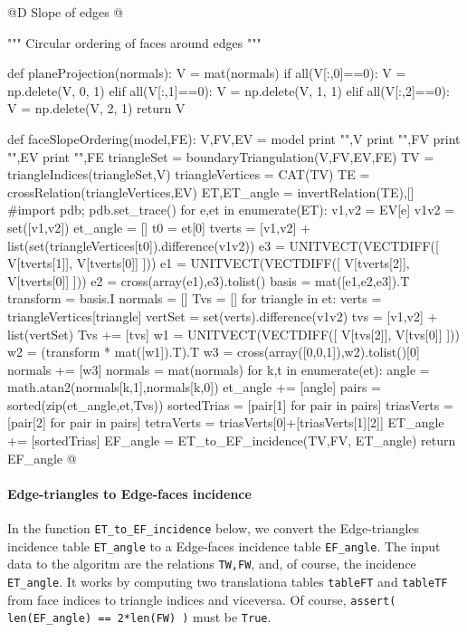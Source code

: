 \documentclass[11pt,oneside]{article}    %
\begin{document}
@D Slope of edges
@{""" Circular ordering of faces around edges """

def planeProjection(normals):
    V = mat(normals)
    if all(V[:,0]==0): V = np.delete(V, 0, 1)
    elif all(V[:,1]==0): V = np.delete(V, 1, 1)
    elif all(V[:,2]==0): V = np.delete(V, 2, 1)
    return V

def faceSlopeOrdering(model,FE):
    V,FV,EV = model
    print "\nV",V
    print "\nFV",FV
    print "\nEV",EV
    print "\nFE",FE
    triangleSet = boundaryTriangulation(V,FV,EV,FE)
    TV = triangleIndices(triangleSet,V)
    triangleVertices = CAT(TV)
    TE = crossRelation(triangleVertices,EV)
    ET,ET_angle = invertRelation(TE),[]
    #import pdb; pdb.set_trace()
    for e,et in enumerate(ET):
        v1,v2 = EV[e]
        v1v2 = set([v1,v2])
        et_angle = []
        t0 = et[0]
        tverts = [v1,v2] + list(set(triangleVertices[t0]).difference(v1v2))
        e3 = UNITVECT(VECTDIFF([ V[tverts[1]], V[tverts[0]] ]))
        e1 = UNITVECT(VECTDIFF([ V[tverts[2]], V[tverts[0]] ]))
        e2 = cross(array(e1),e3).tolist()
        basis = mat([e1,e2,e3]).T
        transform = basis.I
        normals = []
        Tvs = []
        for triangle in et:
            verts = triangleVertices[triangle]
            vertSet = set(verts).difference(v1v2)
            tvs = [v1,v2] + list(vertSet)
            Tvs += [tvs]
            w1 = UNITVECT(VECTDIFF([ V[tvs[2]], V[tvs[0]] ]))
            w2 = (transform * mat([w1]).T).T
            w3 = cross(array([0,0,1]),w2).tolist()[0]
            normals += [w3]
        normals = mat(normals)
        for k,t in enumerate(et):
            angle = math.atan2(normals[k,1],normals[k,0])
            et_angle += [angle]
        pairs = sorted(zip(et_angle,et,Tvs))
        sortedTrias = [pair[1] for pair in pairs]
        triasVerts = [pair[2] for pair in pairs]
        tetraVerts = triasVerts[0]+[triasVerts[1][2]]
        ET_angle += [sortedTrias]
    EF_angle = ET_to_EF_incidence(TV,FV, ET_angle)
    return EF_angle
@}



\paragraph{Edge-triangles to Edge-faces incidence}

In the function \texttt{ET\_to\_EF\_incidence} below, we convert the Edge-triangles incidence table \texttt{ET\_angle} to a Edge-faces incidence table \texttt{EF\_angle}. The input data to the algoritm are the relations \texttt{TW,FW}, and, of course, the incidence \texttt{ET\_angle}. It works by computing two translationa tables \texttt{tableFT} and \texttt{tableTF} from face indices to triangle indices and viceversa. Of course, \texttt{assert( len(EF\_angle) == 2*len(FW) )} must be \texttt{True}.
\end{document}
